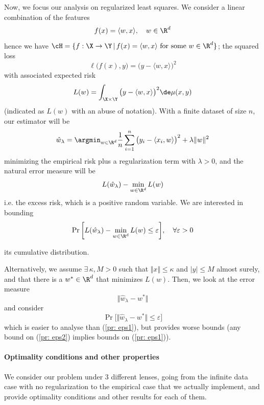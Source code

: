 Now, we focus our analysis on regularized least squares. We consider a linear combination of the features
\[
f(x) = \langle w,x \rangle, \quad w\in\R^d
\]
hence we have $\cH =\{f:\X\to\Y \,\vert\, f(x) = \langle w,x \rangle \text{ for some } w \in\R^d\}$;
the squared loss
\[
\ell\big(f(x),y\big) = {\big(y - \langle w,x\rangle\big)}^2
\]
with associated expected risk
\[
L(w) = \int_{\X\times\Y} \big(y - \langle w,x\rangle\big)^2\de\mu(x,y)
\]
(indicated as $L(w)$ with an abuse of notation).
With a finite dataset of size $n$, our estimator will be 
\begin{equation}\label{eq: estim}
    \hat w_\lambda = \argmin_{w\in\R^d} \frac{1}{n} \sum_{i=1}^n \big(y_i - \langle x_i,w\rangle\big)^2 + \lambda \Vert w \Vert^2
\end{equation}
minimizing the empirical risk plus a regularization term with $\lambda >0$, and the natural error measure will be
\begin{equation}\label{eq: errmeasureLS}
    L(\hat w_\lambda) - \min_{w\in\R^d} L(w)
\end{equation}
i.e. the excess risk, which is a positive random variable. We are interested in bounding
\begin{equation}\label{pr: eps1}
    \Pr \bigg[L(\hat w_\lambda) - \min_{w\in\R^d} L(w) \le \varepsilon\bigg], \quad \forall\varepsilon>0
\end{equation}

its cumulative distribution. 

Alternatively, we assume $\exists \, \kappa,M>0$ such that $\Vert x \Vert \le \kappa$ and $\vert y \vert \le M$ almost surely, and that there is a $w^* \in \R^d$ that minimizes $L(w)$. Then, we look at the error measure
\[
\Vert \hat w_\lambda - w^* \Vert
\]
and consider 
\begin{equation}\label{pr: eps2}
    \Pr \bigg[\Vert \hat w_\lambda - w^* \Vert \le \varepsilon\bigg]
\end{equation}
which is easier to analyse than (\ref{pr: eps1}), but provides worse bounds (any bound on (\ref{pr: eps2}) implies bounds on (\ref{pr: eps1})). 

\paragraph{\bf Optimality conditions and other properties}

We consider our problem under 3 different lenses, going from the infinite data case with no regularization to the empirical case that we actually implement, and provide optimality conditions and other results for each of them. 
\\

